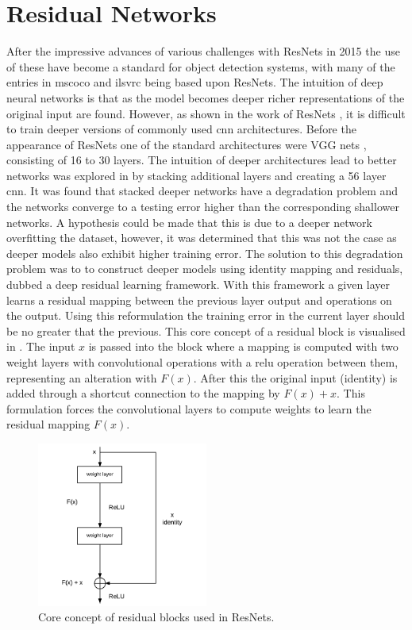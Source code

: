\section{Residual Networks}
After the impressive advances of various challenges with ResNets in 2015 the use of these have become a standard for object detection systems, with many of the entries in \gls{mscoco} and \gls{ilsvrc} being based upon ResNets. The intuition of deep neural networks is that as the model becomes deeper richer representations of the original input are found. However, as shown in the work of ResNets \cite{deepres}, it is difficult to train deeper versions of commonly used \gls{cnn} architectures. Before the appearance of ResNets one of the standard architectures were VGG nets \cite{vgg16}, consisting of 16 to 30 layers. The intuition of deeper architectures lead to better networks was explored in \cite{deepres} by stacking additional layers and creating a 56 layer \gls{cnn}. It was found that stacked deeper networks have a degradation problem and the networks converge to a testing error higher than the corresponding shallower networks. A hypothesis could be made that this is due to a deeper network overfitting the dataset, however, it was determined that this was not the case as deeper models also exhibit higher training error. The solution to this degradation problem was to to construct deeper models using identity mapping and residuals, dubbed a deep residual learning framework. With this framework a given layer learns a residual mapping between the previous layer output and operations on the output. Using this reformulation the training error in the current layer should be no greater that the previous. This core concept of a residual block is visualised in . The input $x$ is passed into the block where a mapping is computed with two weight layers with convolutional operations with a \gls{relu} operation between them, representing an alteration with $F(x)$. After this the original input (identity) is added through a shortcut connection to the mapping by $F(x) + x$. This formulation forces the convolutional layers to compute weights to learn the residual mapping $F(x)$. 

\begin{figure}[H]
  \centering
    \includegraphics[width=0.5\textwidth]{Figs/Techanal/resblock.pdf}
    \caption{Core concept of residual blocks used in ResNets.}
    \label{fig:resblock}
\end{figure}

